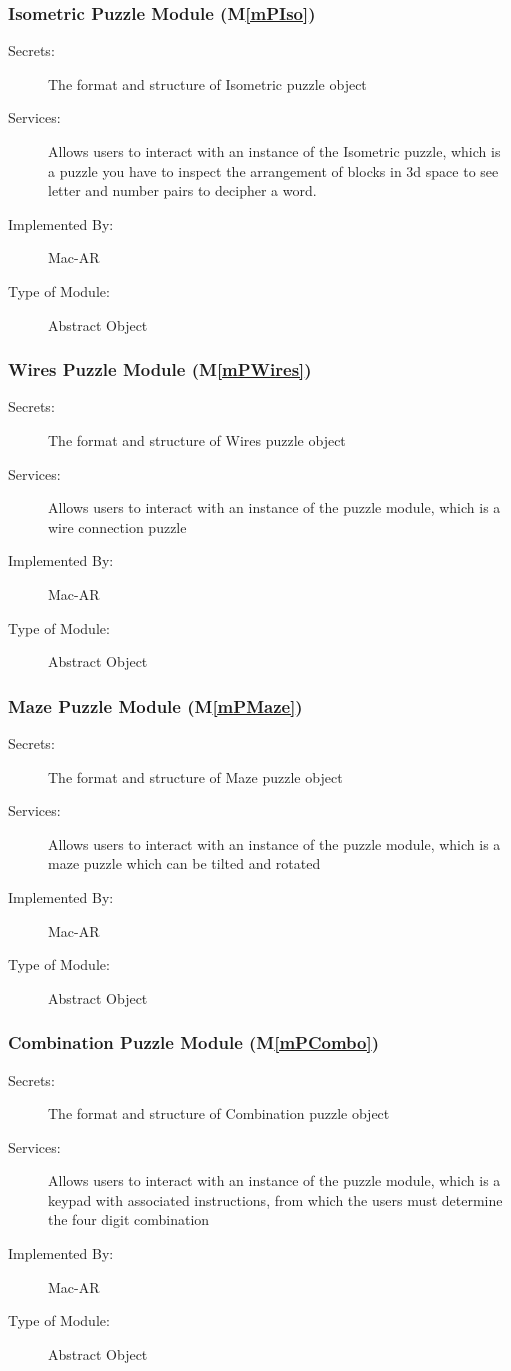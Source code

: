 \documentclass[12pt, titlepage]{article}
\newcommand{\mref}[1]{M\ref{#1}}
\begin{document}
\subsubsection{Isometric Puzzle Module (\mref{mPIso})}
\begin{description}
\item[Secrets:]The format and structure of Isometric puzzle object
\item[Services:]Allows users to interact with an instance of the Isometric puzzle, which is a puzzle you have to inspect the arrangement of blocks in 3d space to see letter and number pairs to decipher a word. 
\item[Implemented By:] Mac-AR
\item[Type of Module:] Abstract Object
\end{description}

\subsubsection{Wires Puzzle Module (\mref{mPWires})}
\begin{description}
\item[Secrets:]The format and structure of Wires puzzle object
\item[Services:]Allows users to interact with an instance of the puzzle module, which is a wire connection puzzle
\item[Implemented By:] Mac-AR
\item[Type of Module:] Abstract Object
\end{description}

\subsubsection{Maze Puzzle Module (\mref{mPMaze})}
\begin{description}
\item[Secrets:]The format and structure of Maze puzzle object
\item[Services:]Allows users to interact with an instance of the puzzle module, which is a maze puzzle which can be tilted and rotated
\item[Implemented By:] Mac-AR
\item[Type of Module:] Abstract Object
\end{description}

\subsubsection{Combination Puzzle Module (\mref{mPCombo})}
\begin{description}
\item[Secrets:]The format and structure of Combination puzzle object
\item[Services:]Allows users to interact with an instance of the puzzle module, which is a keypad with associated instructions, from which the users must determine the four digit combination
\item[Implemented By:] Mac-AR
\item[Type of Module:] Abstract Object
\end{description}
\end{document}
